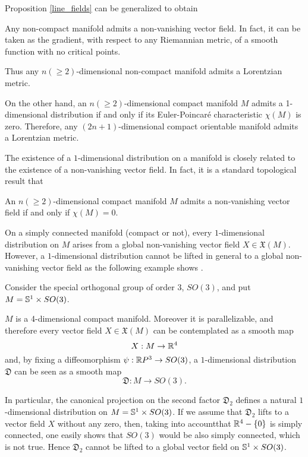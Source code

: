 Proposition \ref{line_fields} can be generalized to obtain \cite{greub72}

Any non-compact manifold admits a non-vanishing vector field. In fact, it can be taken as the gradient, with respect to any Riemannian metric, of a smooth function with no critical points.

Thus any $n(\geq 2)$-dimensional non-compact manifold admits a Lorentzian metric.

On the other hand, an $n(\geq 2)$-dimensional compact manifold $M$ admits a 1-dimensional distribution if and only if its Euler-Poincar\'{e} characteristic $\chi (M)$ is zero. Therefore, any $(2n+1)$-dimensional compact orientable manifold admits a Lorentzian metric.

\vspace{2mm}

The existence of a $1$-dimensional distribution on a manifold is closely related to the existence of a non-vanishing vector field. In fact, it is a standard topological result that

\begin{proposition}
    An $n(\geq 2)$-dimensional compact manifold $M$ admits a non-vanishing vector field if and only if $\chi(M)=0$.
\end{proposition}


On a simply connected manifold (compact or not), every $1$-dimensional distribution on $M$ arises from a global non-vanishing vector field $X\in \mathfrak{X}(M)$. However, a $1$-dimensional distribution cannot be lifted in general to a global non-vanishing vector field as the following example shows \cite{greub72}.

\vspace{2mm}


Consider the special orthogonal group of order 3, $SO(3)$, and put $M=\S^{1}\times SO(3)$.

$M$ is a 4-dimensional compact manifold. Moreover it is parallelizable, and therefore every vector field $X\in\mathfrak{X}(M)$ can be contemplated as a smooth map $$X:M\rightarrow \R^{4}$$ and, by fixing a diffeomorphism $\psi:\R P^{3}\rightarrow SO(3)$, a $1$-dimensional distribution $\mathfrak{D}$ can be seen as a smooth map $$\mathfrak{D}:M\rightarrow SO(3).$$

In particular, the canonical projection on the second factor $\mathfrak{D}_2$ defines a natural $1$-dimensional distribution on $M=\S^{1}\times SO(3)$. If we assume that $\mathfrak{D}_2$ lifts to a vector field $X$ without any zero, then, taking into accountthat $\R^{4}-\{0\}$ is simply connected, one easily shows that $SO(3)$ would be also simply connected, which is not true. Hence $\mathfrak{D}_2$ cannot be lifted to a global vector field on $\S^{1}\times SO(3)$.
